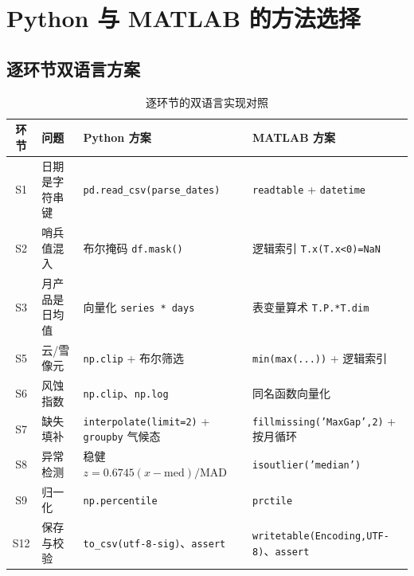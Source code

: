 \documentclass[11pt,a4paper]{ctexart}
\begin{document}
\section{Python 与 MATLAB 的方法选择}

\subsection{逐环节双语言方案}

\begin{table}[H]\centering\footnotesize
\begin{tabularx}{\textwidth}{|c|X|X|X|}
\toprule
环节 & 问题 & Python 方案 & MATLAB 方案 \\
\midrule
S1 & 日期是字符串键 & \texttt{pd.read\_csv(parse\_dates)} & \texttt{readtable} + \texttt{datetime} \\
S2 & 哨兵值混入 & 布尔掩码 \texttt{df.mask()} & 逻辑索引 \texttt{T.x(T.x<0)=NaN} \\
S3 & 月产品是日均值 & 向量化 \texttt{series * days} & 表变量算术 \texttt{T.P.*T.dim} \\
S5 & 云/雪像元 & \texttt{np.clip} + 布尔筛选 & \texttt{min(max(...))} + 逻辑索引 \\
S6 & 风蚀指数 & \texttt{np.clip}、\texttt{np.log} & 同名函数向量化 \\
S7 & 缺失填补 & \texttt{interpolate(limit=2)} + \texttt{groupby} 气候态 & \texttt{fillmissing('MaxGap',2)} + 按月循环 \\
S8 & 异常检测 & 稳健 $z=0.6745(x-\mathrm{med})/\mathrm{MAD}$ & \texttt{isoutlier('median')} \\
S9 & 归一化 & \texttt{np.percentile} & \texttt{prctile} \\
S12 & 保存与校验 & \texttt{to\_csv(utf-8-sig)}、\texttt{assert} & \texttt{writetable(Encoding,UTF-8)}、\texttt{assert} \\
\bottomrule
\end{tabularx}
\caption{逐环节的双语言实现对照}
\end{table}
\end{document}
